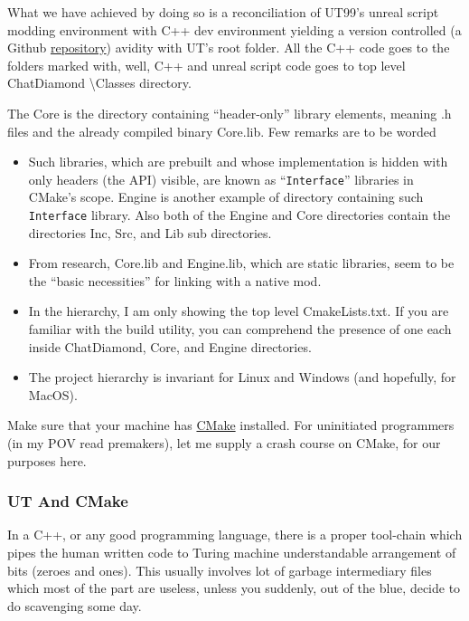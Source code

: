 \documentclass{article}
\theoremstyle{definition}
\newcommand{\FileColor}[1]{{\color{Purple} #1}}
\newcommand{\FolderColor}[1]{{\color{mygray} #1}}
\begin{document}
What we have achieved by doing so is a reconciliation of UT99's unreal script modding environment with C++ dev environment yielding a version controlled  (a Github 
\href{https://github.com/ravimohan1991/ChatDiamond}{repository}) avidity with UT's root folder.  
All the C++ code goes to the folders marked with, well, C++ and unreal script code goes to top level \FolderColor{ChatDiamond \textbackslash Classes} directory.  

The \FolderColor{Core} is the directory containing ``header-only'' library elements, meaning .h files and the already compiled binary \FileColor{Core.lib}.  Few remarks are to be worded
\begin{itemize}
\item Such libraries, which are prebuilt and whose implementation is hidden with only headers (the API) visible, are known as ``\texttt{Interface}'' libraries in CMake's scope.  \FolderColor{Engine} is another example of directory containing such \texttt{Interface} library.  
Also both of the \FolderColor{Engine} and \FolderColor{Core} directories contain the directories \FolderColor{Inc}, \FolderColor{Src}, and \FolderColor{Lib} sub directories. 
\item From research, \FileColor{Core.lib} and \FileColor{Engine.lib}, which are static libraries, seem to be the ``basic necessities'' for linking with a native mod. 
\item In the hierarchy, I am only showing the top level \FileColor{CmakeLists.txt}.  If you are familiar with the build utility, you can comprehend the presence of one each inside \FolderColor{ChatDiamond}, \FolderColor{Core}, and \FolderColor{Engine} directories.
\item The project hierarchy is invariant for Linux and Windows (and hopefully, for MacOS).
\end{itemize}  

Make sure that your machine has \href{https://cmake.org/}{CMake} installed.  For uninitiated programmers (in my POV read premakers), let me
supply a crash course on CMake, for our purposes here.

\subsubsection{UT And CMake}
In a C++, or any good programming language, there is a proper tool-chain which pipes the human written code to Turing machine understandable arrangement of bits 
(zeroes and ones).  This usually involves lot of garbage intermediary files which most of the part are useless, unless you suddenly, out of the blue, decide to do 
scavenging some day.
\end{document}
